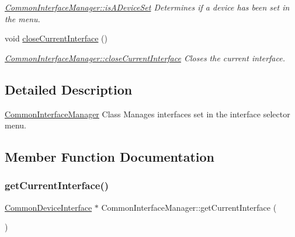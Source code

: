\begin{DoxyCompactItemize}
\begin{DoxyCompactList}\small\item\em \hyperlink{class_common_interface_manager_abd7a314803309cdb6789eaf36f90b7b7}{Common\+Interface\+Manager\+::is\+A\+Device\+Set} Determines if a device has been set in the menu. \end{DoxyCompactList}\item 
\hypertarget{class_common_interface_manager_a16ab6917c45e1b40efe61d5379206ceb}{}\label{class_common_interface_manager_a16ab6917c45e1b40efe61d5379206ceb} 
void \hyperlink{class_common_interface_manager_a16ab6917c45e1b40efe61d5379206ceb}{close\+Current\+Interface} ()
\begin{DoxyCompactList}\small\item\em \hyperlink{class_common_interface_manager_a16ab6917c45e1b40efe61d5379206ceb}{Common\+Interface\+Manager\+::close\+Current\+Interface} Closes the current interface. \end{DoxyCompactList}\end{DoxyCompactItemize}


\subsection{Detailed Description}
\hyperlink{class_common_interface_manager}{Common\+Interface\+Manager} Class Manages interfaces set in the interface selector menu. 

\subsection{Member Function Documentation}
\hypertarget{class_common_interface_manager_a24a72b0f78f9e6037e2da899e8170b2f}{}\label{class_common_interface_manager_a24a72b0f78f9e6037e2da899e8170b2f} 
\subsubsection{\texorpdfstring{get\+Current\+Interface()}{getCurrentInterface()}}
{\footnotesize\ttfamily \hyperlink{class_common_device_interface}{Common\+Device\+Interface} $\ast$ Common\+Interface\+Manager\+::get\+Current\+Interface (\begin{DoxyParamCaption}{ }\end{DoxyParamCaption})}



